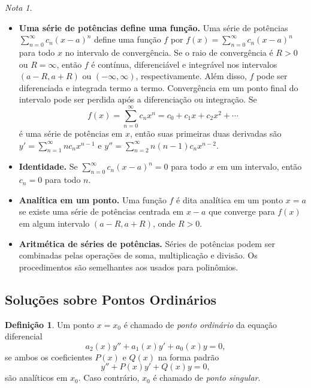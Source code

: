 \documentclass{article}
\theoremstyle{plain}
\theoremstyle{definition}
\newtheorem{defn}{Definição}[section]
\theoremstyle{remark}
\newtheorem*{rem}{Nota}
\begin{document}
\begin{rem}
\begin{itemize}
        \item \textbf{Uma série de potências define uma função.} Uma série de potências \(\sum_{n=0}^{\infty} c_n (x-a)^n\) define uma função \(f\) por \( f(x) = \sum_{n=0}^{\infty} c_n (x-a)^n\) para todo \(x\) no intervalo de convergência. Se o raio de convergência é \(R>0\) ou \(R = \infty\), então \(f\) é contínua, diferenciável e integrável nos intervalos \((a-R, a+R)\) ou \((-\infty, \infty)\), respectivamente. Além disso, \(f\) pode ser diferenciada e integrada termo a termo. Convergência em um ponto final do intervalo pode ser perdida após a diferenciação ou integração. Se 
        \[ f(x) = \sum_{n=0}^{\infty} c_n x^n = c_0 + c_1 x + c_2 x^2 + \cdots \]
        \noindent é uma série de potências em \(x\), então suas primeiras duas derivadas são \( y' = \sum_{n=1}^{\infty} n c_n x^{n-1}\) e \( y'' = \sum_{n=2}^{\infty} n(n-1)c_n x^{n-2}\).
        \item \textbf{Identidade.} Se \(\sum_{n=0}^{\infty} c_n (x-a)^n = 0\) para todo \(x\) em um intervalo, então \(c_n = 0\) para todo \(n\).
        \item \textbf{Analítica em um ponto.} Uma função \(f\) é dita analítica em um ponto \(x=a\) se existe uma série de potências centrada em \(x-a\) que converge para \(f(x)\) em algum intervalo \((a-R, a+R)\), onde \(R>0\).
        \item \textbf{Aritmética de séries de potências.} Séries de potências podem ser combinadas pelas operações de soma, multiplicação e divisão. Os procedimentos são semelhantes aos usados para polinômios.
    \end{itemize}
\end{rem}

\subsection{Soluções sobre Pontos Ordinários}

\begin{defn}
    Um ponto \(x=x_0\) é chamado de \emph{ponto ordinário} da equação diferencial
    \begin{equation}\label{eq:edo1}
        a_2(x)y'' + a_1(x)y' + a_0(x)y = 0,
    \end{equation}
    \noindent se ambos os coeficientes \(P(x)\) e \(Q(x)\) na forma padrão
    \begin{equation}\label{eq:edo2}
        y'' + P(x)y' + Q(x)y = 0,
    \end{equation}
\noindent são analíticos em \(x_0\). Caso contrário, \(x_0\) é chamado de \emph{ponto singular}.
\end{defn}
\end{document}
